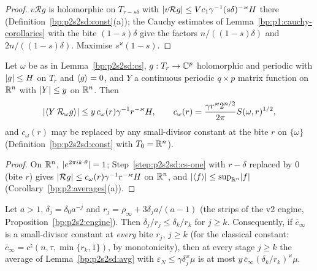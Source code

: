 \begin{proof}
\label{step:p2s2sd:rc}
$v\mathcal Rg$ is holomorphic on $T_{r-s\delta}$ with $\lvert v\mathcal Rg\rvert\le Vc_1\gamma^{-1}(s\delta)^{-\varkappa}H$ there
(Definition~\ref{bp:p2s2sd:const}(a)); the Cauchy estimates of Lemma~\ref{bp:p1:cauchy-corollaries} with the bite $(1-s)\delta$ give the factors
$n/((1-s)\delta)$ and $2n/((1-s)\delta)$. Maximise $s^\varkappa(1-s)$.
\end{proof}

\begin{lemma}\label{bp:p2s2sd:avg}
Let $\omega$ be as in Lemma~\ref{bp:p2s2sd:cs}, $g:T_r\to\mathbb{C}^p$ holomorphic and periodic with $\lvert g\rvert\le H$ on $T_r$ and $\langle g\rangle=0$, and $Y$ a
continuous periodic $q\times p$ matrix function on $\mathbb{R}^n$ with $\lvert Y\rvert\le y$ on $\mathbb{R}^n$. Then
\[
\lvert \langle Y\,\mathcal R_\omega g\rangle\rvert\le y\,c_\omega(r)\gamma^{-1}r^{-\varkappa}H,\qquad c_\omega(r)=\frac{\gamma r^\varkappa2^{n/2}}{2\pi}S(\omega,r)^{1/2},
\]
and $c_\omega(r)$ may be replaced by any small-divisor constant at the bite $r$ on $\{\omega\}$ (Definition~\ref{bp:p2s2sd:const} with $T_0=\mathbb{R}^n$).
\end{lemma}

\begin{proof}
\label{step:p2s2sd:avg}
On $\mathbb{R}^n$, $\lvert e^{2\pi ik\cdot\theta}\rvert=1$; Step~\ref{step:p2s2sd:cs-one} with $r-\delta$ replaced by $0$ (bite $r$) gives
$\lvert \mathcal Rg\rvert\le c_\omega(r)\gamma^{-1}r^{-\varkappa}H$ on $\mathbb{R}^n$, and $\lvert \langle f\rangle\rvert\le\sup_{\mathbb{R}^n}\lvert f\rvert$ (Corollary~\ref{bp:p2:averages}(a)).
\end{proof}

\begin{corollary}\label{bp:p2s2sd:avg-tail}
Let $a>1$, $\delta_j=\delta_0a^{-j}$ and $r_j=\rho_\infty+3\delta_ja/(a-1)$ (the strips of the v2 engine, Proposition~\ref{bp:p2s2:engine}). Then
$\delta_j/r_j\le\delta_k/r_k$ for $j\ge k$. Consequently, if $\bar c_\infty$ is a small-divisor constant at \emph{every} bite $r_j$, $j\ge k$ (for the
classical constant: $\bar c_\infty=c^\natural(n,\tau,\min\{r_k,1\})$, by monotonicity), then at every stage $j\ge k$ the average of
Lemma~\ref{bp:p2s2sd:avg} with $\varepsilon_N\le\gamma\delta_j^\varkappa\mu$ is at most $y\,\bar c_\infty(\delta_k/r_k)^\varkappa\mu$.
\end{corollary}

